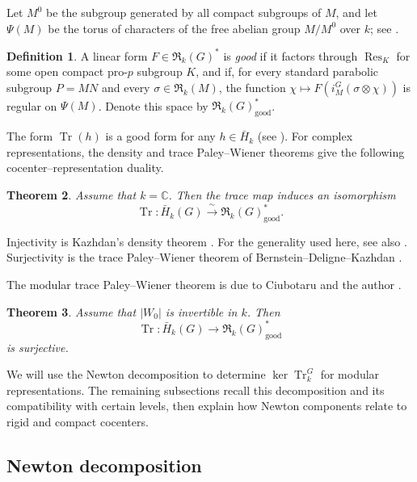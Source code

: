 \documentclass[11pt,letterpaper]{amsart}
\newtheorem{theorem}{Theorem}
\theoremstyle{definition}
\newtheorem{definition}[theorem]{Definition}
\numberwithin{equation}{section}
\numberwithin{theorem}{section}
\newcommand{\kk}{k}
\newcommand{\CC}{\mathbb C}
\newcommand{\cR}{\mathfrak R}
\DeclareMathOperator{\Tr}{Tr}
\DeclareMathOperator{\Res}{Res}
\begin{document}
Let $M^0$ be the subgroup generated by all compact
subgroups of $M$, and let $\Psi(M)$ be the torus of
characters of the free abelian group $M/M^0$ over $\kk$;
see \cite[\S6.1]{CHIII}.

\begin{definition}\label{def:good-forms}
A linear form $F\in\cR_\kk(G)^*$ is \emph{good} if it
factors through $\Res_K$ for some open compact pro-$p$
subgroup $K$, and if, for every standard parabolic subgroup
$P=MN$ and every $\sigma\in\cR_\kk(M)$, the function
$\chi\mapsto F(i_M^G(\sigma\otimes\chi))$ is regular on
$\Psi(M)$. Denote this space by
$\cR_\kk(G)^*_{\mathrm{good}}$.
\end{definition}

The form $\Tr(h)$ is a good form for any $h \in \bar H_\kk$ (see \cite[\S6.1]{CHIII}). For complex representations, the density and trace Paley--Wiener theorems give the following cocenter--representation duality.

\begin{theorem}\label{thm:classical-trace}
Assume that $\kk=\CC$. Then the trace map induces an isomorphism
\[
 \Tr:\bar H_\kk(G)\xrightarrow{\ \sim\ }
                         \cR_\kk(G)^*_{\mathrm{good}}.
\]
\end{theorem}

Injectivity is Kazhdan's density theorem \cite{Kaz86,KazClose}. For the generality used here, see also \cite[Part~II, \S1.10]{HL}. Surjectivity is the trace Paley--Wiener theorem of Bernstein--Deligne--Kazhdan \cite{BDK}.

The modular trace Paley--Wiener theorem is due to
Ciubotaru and the author \cite[Theorem~6.1]{CHIII}.

\begin{theorem}\label{thm:known-tpw}
Assume that $|W_0|$ is invertible in $\kk$. Then
\[
 \Tr:\bar H_\kk(G)\longrightarrow
                 \cR_\kk(G)^*_{\mathrm{good}}
\]
is surjective.
\end{theorem}

We will use the Newton decomposition to determine $\ker\Tr_\kk^G$ for modular representations. The remaining subsections recall this decomposition and its compatibility with certain levels, then explain how Newton components relate to rigid and compact cocenters.

\subsection{Newton decomposition}
\label{subsec:newton-decomposition}
\end{document}
